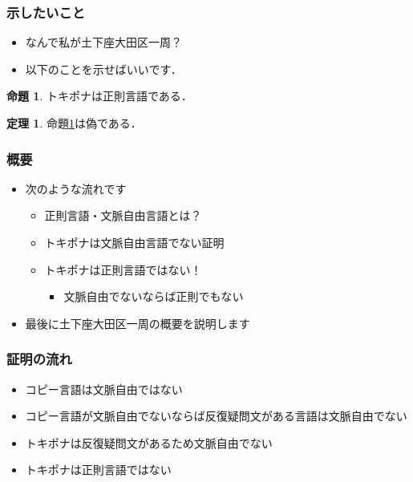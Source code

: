 \documentclass[14pt]{beamer}
\theoremstyle{definition}
\newtheorem{thm}{定理}
\newtheorem{prop}{命題}
\begin{document}
\begin{frame}
	\frametitle{示したいこと}

	\begin{itemize}
		\item なんで私が土下座大田区一周？
		\item 以下のことを示せばいいです．
	\end{itemize}

	\begin{tcolorbox}[
			colframe=orange!80,
			colback=orange!20,
			sharp corners]
		\begin{prop}\label{prop:pona}
			トキポナは正則言語である．
		\end{prop}

		\begin{thm}
			命題\ref{prop:pona}は偽である．
		\end{thm}
	\end{tcolorbox}

\end{frame}


\begin{frame}
	\frametitle{概要}

	\begin{itemize}
		\item 次のような流れです
			\begin{itemize}
				\item 正則言語・文脈自由言語とは？
				\item トキポナは文脈自由言語でない証明
				\item トキポナは正則言語ではない！
					\begin{itemize}
						\item 文脈自由でないならば正則でもない
					\end{itemize}
			\end{itemize}
		\item 最後に土下座大田区一周の概要を説明します
	\end{itemize}

\end{frame}


\begin{frame}
	\frametitle{証明の流れ}

	\begin{itemize}
		\item コピー言語は文脈自由ではない
		\item コピー言語が文脈自由でないならば反復疑問文がある言語は文脈自由でない
		\item トキポナは反復疑問文があるため文脈自由でない
		\item トキポナは正則言語ではない
	\end{itemize}

\end{frame}
\end{document}
